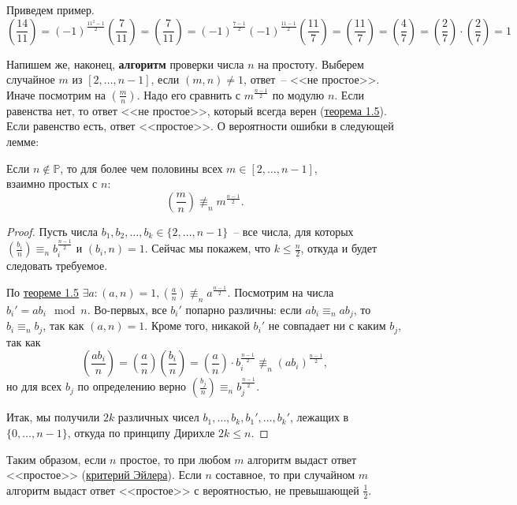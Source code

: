 Приведем пример.
$$(\frac{14}{11}) = (-1)^\frac{11^2-1}{2}(\frac{7}{11}) = (\frac{7}{11}) = (-1)^\frac{7-1}{2}(-1)^\frac{11-1}{2}(\frac{11}{7}) = (\frac{11}{7}) = (\frac{4}{7}) = (\frac{2}{7})\cdot(\frac{2}{7}) = 1$$

Напишем же, наконец, \textbf{алгоритм} проверки числа $n$ на простоту. Выберем случайное $m$ из $[2,\ldots,n-1]$, если $(m,n)\ne 1$, ответ~-- <<не простое>>. Иначе посмотрим на $(\frac{m}{n})$. Надо его сравнить с $m^{\frac{n-1}{2}}$ по модулю $n$. Если равенства нет, то ответ <<не простое>>, который всегда верен (\hyperlink{solovaytest}{теорема 1.5}). Если равенство есть, ответ <<простое>>. О вероятности ошибки в следующей лемме:
\begin{lemma} Если $n\not\in\mathbb{P}$, то для более чем половины всех $m \in [2, \ldots, n-1]$,\\ взаимно простых с $n$: $$(\frac{m}{n})\not\equiv_n m^{\frac{n-1}{2}}.$$
\end{lemma}
\begin{proof}
Пусть числа $b_1, b_2, \ldots, b_k \in \{2, \ldots, n-1\}$~-- все числа, для которых $(\frac{b_i}{n})\equiv_n b_i^\frac{n-1}{2}$ и $(b_i,n)=1$. Сейчас мы покажем, что $k \leq \frac{n}{2}$, откуда и будет следовать требуемое.

По \hyperlink{solovaytest}{теореме 1.5} $\exists a: (a,n)=1, (\frac{a}{n})\not\equiv_n a^\frac{n-1}{2}$. Посмотрим на  числа $b_i' = ab_i \mod {n}$. Во-первых, все $b_i'$ попарно различны: если $ab_i \equiv_n ab_j$, то $b_i \equiv_n b_j$, так как $(a,n)=1$. Кроме того, никакой $b_i'$ не совпадает ни с каким $b_j$, так как
$$(\frac{ab_i}{n})=(\frac{a}{n})(\frac{b_i}{n})=(\frac{a}{n})\cdot b_i^\frac{n-1}{2}\not\equiv_n (ab_i)^\frac{n-1}{2},$$
но для всех $b_j$ по определению верно $(\frac{b_j}{n}) \equiv_n b_j^\frac{n-1}{2}$.

Итак, мы получили $2k$ различных чисел $b_1, \ldots, b_k, b_1', \ldots, b_k'$, лежащих в $\{0, \ldots, n-1\}$, откуда по принципу Дирихле $2k \leq n$.
\end{proof}

Таким образом, если $n$ простое, то при любом $m$ алгоритм выдаст ответ <<простое>> (\hyperlink{euler}{критерий Эйлера}). Если $n$ составное, то при случайном $m$ алгоритм выдаст ответ <<простое>> с вероятностью, не превышающей $\frac{1}{2}$.
